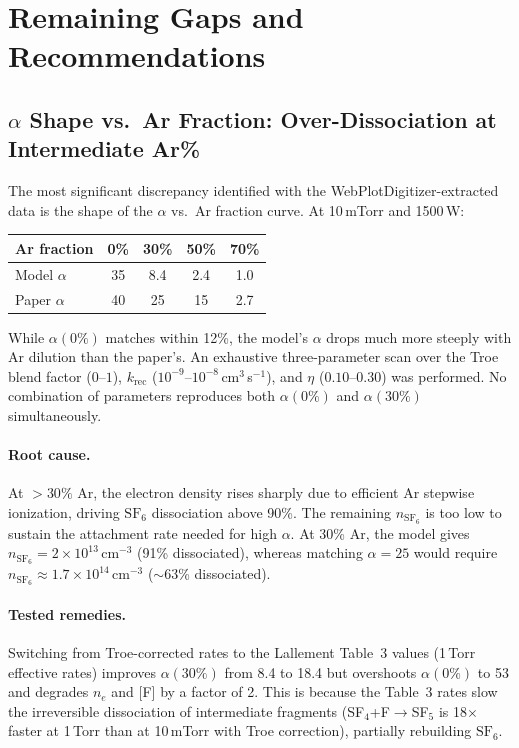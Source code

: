\documentclass[11pt,a4paper]{article}
\newcommand{\SFsix}{\mathrm{SF}_6}
\newcommand{\ne}{n_e}
\begin{document}
\section{Remaining Gaps and Recommendations}

\subsection{$\alpha$ Shape vs.\ Ar Fraction: Over-Dissociation at Intermediate Ar\%}
\label{sec:alpha_shape}

The most significant discrepancy identified with the WebPlotDigitizer-extracted data is the shape of the $\alpha$ vs.\ Ar fraction curve.  At 10\,mTorr and 1500\,W:

\begin{center}
\small
\begin{tabular}{lcccc}
\toprule
Ar fraction & 0\% & 30\% & 50\% & 70\% \\
\midrule
Model $\alpha$ & 35 & 8.4 & 2.4 & 1.0 \\
Paper $\alpha$ & 40 & 25 & 15 & 2.7 \\
\bottomrule
\end{tabular}
\end{center}

While $\alpha(0\%)$ matches within 12\%, the model's $\alpha$ drops much more steeply with Ar dilution than the paper's.  An exhaustive three-parameter scan over the Troe blend factor ($0$--$1$), $k_\mathrm{rec}$ ($10^{-9}$--$10^{-8}$\,cm$^3$\,s$^{-1}$), and $\eta$ ($0.10$--$0.30$) was performed.  No combination of parameters reproduces both $\alpha(0\%)$ and $\alpha(30\%)$ simultaneously.

\paragraph{Root cause.} At $>30\%$ Ar, the electron density rises sharply due to efficient Ar stepwise ionization, driving $\SFsix$ dissociation above 90\%.  The remaining $n_{\SFsix}$ is too low to sustain the attachment rate needed for high $\alpha$.  At 30\% Ar, the model gives $n_{\SFsix} = 2 \times 10^{13}$\,cm$^{-3}$ (91\% dissociated), whereas matching $\alpha = 25$ would require $n_{\SFsix} \approx 1.7 \times 10^{14}$\,cm$^{-3}$ ($\sim$63\% dissociated).

\paragraph{Tested remedies.}  Switching from Troe-corrected rates to the Lallement Table~3 values (1\,Torr effective rates) improves $\alpha(30\%)$ from 8.4 to 18.4 but overshoots $\alpha(0\%)$ to 53 and degrades $\ne$ and [F] by a factor of 2.  This is because the Table~3 rates slow the irreversible dissociation of intermediate fragments (SF$_4$+F$\to$SF$_5$ is 18$\times$ faster at 1\,Torr than at 10\,mTorr with Troe correction), partially rebuilding $\SFsix$.
\end{document}
